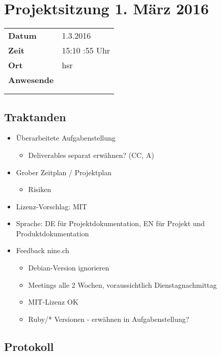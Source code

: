 \documentclass[class=scrbook,crop=false]{standalone}
\begin{document}
	
	\section{Projektsitzung 1. März 2016}
	
	\begin{tabular}{ll}
		\textbf{Datum} & 1.3.2016 \\
		\textbf{Zeit} & 15:10 \textendash 14:55  Uhr \\
		\textbf{Ort} & \acs{hsr} \\
		\textbf{Anwesende} & \proff \\ & \ubos \\ & \pchr
	\end{tabular}
	
	\subsection*{Traktanden}
	\begin{itemize}
		\item Überarbeitete Aufgabenstellung
		\begin{itemize}
    		\item Deliverables separat erwähnen? (CC, A)
    	\end{itemize}
		\item Grober Zeitplan / Projektplan
		\begin{itemize}
    		\item Risiken
    	\end{itemize}
		\item Lizenz-Vorschlag: MIT
		\item Sprache: DE für Projektdokumentation, EN für Projekt und Produktdokumentation
		\item Feedback nine.ch
		\begin{itemize}
    		\item Debian-Version ignorieren
    		\item Meetings alle 2 Wochen, voraussichtlich Dienstagnachmittag
    		\item MIT-Lizenz OK
    		\item Ruby/* Versionen - erwähnen in Aufgabenstellung?
    	\end{itemize}
	\end{itemize}
	
	\subsection*{Protokoll}
\end{document}
